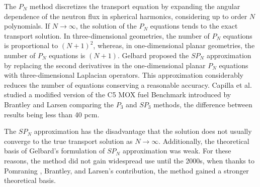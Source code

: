\documentclass{anstrans}
\begin{document}
The $P_N$ method \cite{davidson_neutron_1957} discretizes the transport equation by expanding the angular dependence of the neutron flux in spherical harmonics, considering up to order $N$ polynomials.
If $N \rightarrow \infty$, the solution of the $P_N$ equations tends to the exact transport solution.
In three-dimensional geometries, the number of $P_N$ equations is proportional to $(N+1)^2$, whereas, in one-dimensional planar geometries, the number of $P_N$ equations is $(N+1)$.
Gelbard \cite{gelbard_spherical_1960} proposed the $SP_N$ approximation by replacing the second derivatives in the one-dimensional planar $P_N$ equations with three-dimensional Laplacian operators.
This approximation considerably reduces the number of equations conserving a reasonable accuracy.
Capilla et al. \cite{capilla_applications_2009} studied a modified version of the C5 \gls{MOX} fuel Benchmark \cite{cavarec_benchmark_1994} introduced by Brantley and Larsen \cite{brantley_simplifiedP3_2000} comparing the $P_3$ and $SP_3$ methods, the difference between results being less than 40 pcm.

The $SP_N$ approximation has the disadvantage that the solution does not usually converge to the true transport solution as $N \rightarrow \infty$.
Additionally, the theoretical basis of Gelbard's formulation of $SP_N$ approximation was weak.
For these reasons, the method did not gain widespread use until the 2000s, when thanks to Pomraning \cite{pomraning_asymptotic_1993}, Brantley, and Larsen's \cite{brantley_simplifiedP3_2000} contribution, the method gained a stronger theoretical basis.
\end{document}
